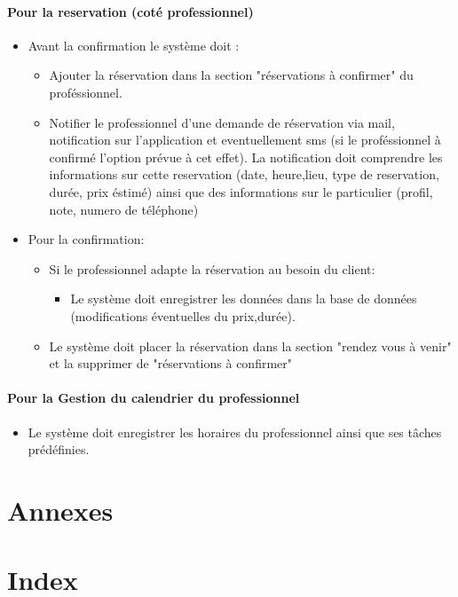\documentclass{article}
\begin{document}
\paragraph{Pour la reservation (coté professionnel) }
\begin{itemize}
\item Avant la confirmation le système doit :
	\begin{itemize}
	
	\item Ajouter la réservation dans la section "réservations à confirmer" du  proféssionnel.
    \item Notifier le professionnel d'une demande de réservation via mail, notification sur l'application et eventuellement sms (si le proféssionnel à confirmé l'option prévue à cet effet).
		La notification doit comprendre les informations sur cette reservation (date, heure,lieu, type de reservation, durée, prix éstimé)
		ainsi que des informations sur le particulier (profil, note, numero de téléphone)
	\end{itemize}
\item Pour la confirmation:
	\begin{itemize}
	\item Si le professionnel adapte la réservation au besoin du client:
		\begin{itemize}
		\item Le système doit enregistrer les données dans la base de données (modifications éventuelles du prix,durée).
		\end{itemize}
	\end{itemize}
	\begin{itemize}
    \item Le système doit placer la réservation dans la section "rendez vous à venir" et la supprimer de "réservations à confirmer"
	\end{itemize}
\end{itemize}



\paragraph{Pour la Gestion du calendrier du professionnel }
\begin{itemize}
\item Le système doit enregistrer les horaires du professionnel ainsi que ses tâches prédéfinies.
\end{itemize}

\section{Annexes}


\section{Index}
\end{document}
